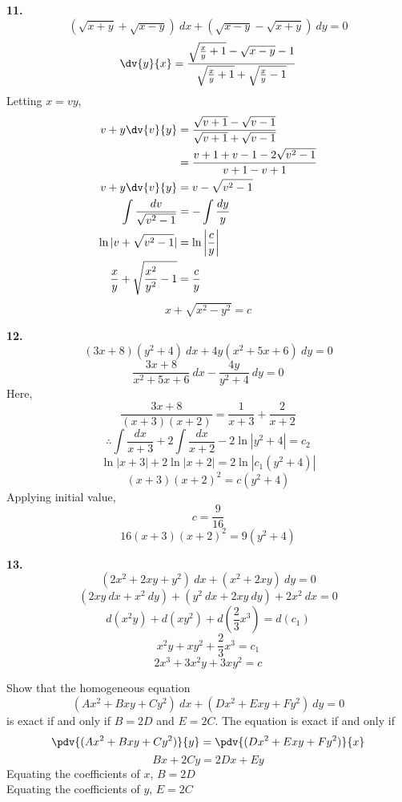 \begin{exercise}
    \textbf{11.}
    \[ (\sqrt{x+y} + \sqrt{x-y}) \: d{x} + (\sqrt{x-y} - \sqrt{x+y}) \: d{y} = 0 \]
    \[ \dv{y}{x} = \frac{\sqrt{\frac{x}{y}+1} - \sqrt{x-y}-1}{\sqrt{\frac{x}{y}+1} + \sqrt{\frac{x}{y}-1}} \]
    Letting $x = vy$,
    \begin{align*}
        v + y\dv{v}{y} &= \frac{\sqrt{v+1} - \sqrt{v-1}}{\sqrt{v+1} + \sqrt{v-1}} \\
        &= \frac{v+1+v-1-2\sqrt{v^2-1}}{v+1-v+1} \\
        v + y\dv{v}{y} &= v - \sqrt{v^2-1} \\
        \int{ \frac{dv}{\sqrt{v^2-1}} } &= -\int{ \frac{dy}{y} } \\
        \ln |v + \sqrt{v^2-1}| &= \ln \left| \frac{c}{y} \right| \\
        \frac{x}{y} + \sqrt{\frac{x^2}{y^2} - 1} &= \frac{c}{y} \\
    \end{align*}
    \[ \boxed{ x + \sqrt{x^2-y^2}  = c } \]

    \textbf{12.}
    \[ (3x+8)(y^2+4) \: d{x} + 4y(x^2+5x+6) \: d{y} = 0 \]
    \[ \frac{3x+8}{x^2+5x+6} \: d{x} - \frac{4y}{y^2+4} \: d{y} = 0 \]
    Here, \[
        \frac{3x+8}{(x+3)(x+2)} = \frac{1}{x+3} + \frac{2}{x+2}
    \]
    \[ \therefore \int{ \frac{dx}{x+3} } + 2\int{ \frac{dx}{x+2} } - 2\ln|y^2+4| = c_2 \]
    \[ \ln|x+3| + 2\ln|x+2| = 2\ln|c_1(y^2+4)| \]
    \[ (x+3)(x+2)^2 = c(y^2+4) \]
    Applying initial value,
    \[ c = \frac{9}{16} \]
    \[ \boxed{ 16(x+3)(x+2)^2 = 9(y^2+4) } \]

    \textbf{13.}
    \[ (2x^2+2xy+y^2) \: d{x} + (x^2+2xy) \: d{y} = 0 \]
    \[ (2xy \: dx + x^2 \: dy) + (y^2 \: dx + 2xy \: dy) + 2x^2 \: dx = 0 \]
    \[ d(x^2y) + d(xy^2) + d\left( \frac{2}{3}x^3 \right) = d(c_1) \]
    \[ x^2y + xy^2 + \frac{2}{3}x^3 = c_1 \]
    \[ \boxed{ 2x^3 + 3x^2y + 3xy^2 = c } \]
\end{exercise}

\begin{exercise}{
    Show that the homogeneous equation \[
        (Ax^2 + Bxy + Cy^2) \: d{x} + (Dx^2 + Exy + Fy^2) \: d{y} = 0
\] is exact if and only if $B=2D$ and $E=2C$.
}{}
    The equation is exact if and only if \[
        \pdv{(Ax^2 + Bxy + Cy^2)}{y} = \pdv{(Dx^2 + Exy + Fy^2)}{x}
    \]
    \[ Bx + 2Cy = 2Dx + Ey \]
    Equating the coefficients of $x$, $B = 2D$ \\
    Equating the coefficients of $y$, $E = 2C$
\end{exercise}


